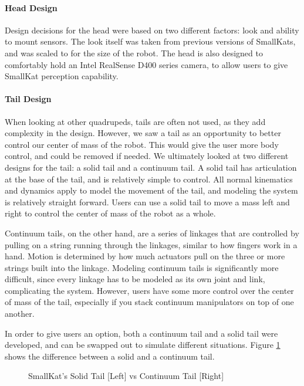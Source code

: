             \paragraph{Head Design}
                Design decisions for the head were based on two different factors: look and ability to mount sensors. The look itself was taken from previous versions of SmallKats, and was scaled to for the size of the robot. The head is also designed to comfortably hold an Intel RealSense D400 series camera, to allow users to give SmallKat perception capability.

            \paragraph{Tail Design}
                When looking at other quadrupeds, tails are often not used, as they add complexity in the design. However, we saw a tail as an opportunity to better control our center of mass of the robot. This would give the user more body control, and could be removed if needed. We ultimately looked at two different designs for the tail: a solid tail and a continuum tail. A solid tail has articulation at the base of the tail, and is relatively simple to control. All normal kinematics and dynamics apply to model the movement of the tail, and modeling the system is relatively straight forward. Users can use a solid tail to move a mass left and right to control the center of mass of the robot as a whole.

                Continuum tails, on the other hand, are a series of linkages that are controlled by pulling on a string running through the linkages, similar to how fingers work in a hand. Motion is determined by how much actuators pull on the three or more strings built into the linkage. Modeling continuum tails is significantly more difficult, since every linkage has to be modeled as its own joint and link, complicating the system. However, users have some more control over the center of mass of the tail, especially if you stack continuum manipulators on top of one another.

                In order to give users an option, both a continuum tail and a solid tail were developed, and can be swapped out to simulate different situations. Figure \ref{fig:TailComparison} shows the difference between a solid and a continuum tail.
                
                \begin{figure}[H]
                    \centering

                    \caption{SmallKat's Solid Tail [Left] vs Continuum Tail [Right]}
                    \label{fig:TailComparison}
                \end{figure}

